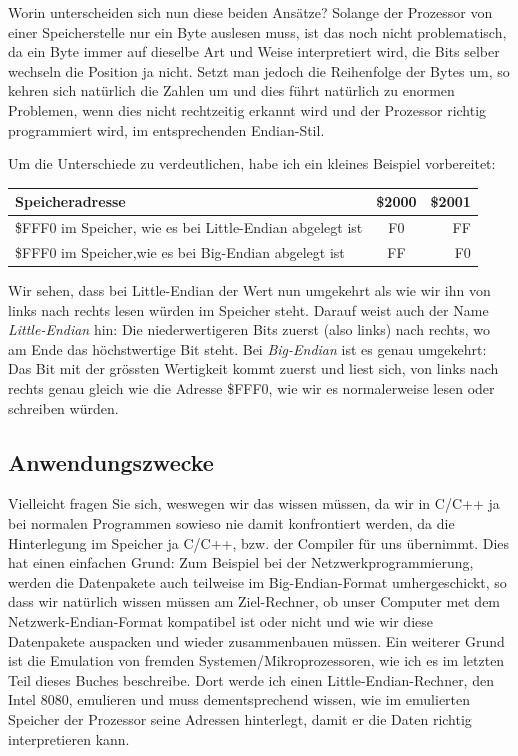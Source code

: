\documentclass[b5paper,10pt,dvips,fleqn,titlepage,twoside]{book}
\begin{document}
Worin unterscheiden sich nun diese beiden Ansätze? Solange der Prozessor von einer Speicherstelle nur ein Byte auslesen muss, ist das noch nicht problematisch, da ein Byte immer auf dieselbe Art und Weise interpretiert wird, die Bits selber wechseln die Position ja nicht. Setzt man jedoch die Reihenfolge der Bytes um, so kehren sich natürlich die Zahlen um und dies führt natürlich zu enormen Problemen, wenn dies nicht rechtzeitig erkannt wird und der Prozessor richtig programmiert wird, im entsprechenden Endian-Stil.\newline

Um die Unterschiede zu verdeutlichen, habe ich ein kleines Beispiel vorbereitet:\newline

\begin{center}
\begin{tabular}{|p{2in}|c|r|}\hline
Speicheradresse & \$2000 & \$2001 \\\hline
\$FFF0 im Speicher, wie es bei Little-Endian abgelegt ist & F0 & FF\\\hline
\$FFF0 im Speicher,wie es bei Big-Endian abgelegt ist & FF & F0\\\hline
\end{tabular}
\end{center}


Wir sehen, dass bei Little-Endian der Wert nun umgekehrt als wie wir ihn von links nach rechts lesen würden im Speicher steht. Darauf weist auch der Name \emph{Little-Endian} hin: Die niederwertigeren Bits zuerst (also links) nach rechts, wo am Ende das höchstwertige Bit steht. Bei \emph{Big-Endian} ist es genau umgekehrt: Das Bit mit der grössten Wertigkeit kommt zuerst und liest sich, von links nach rechts genau gleich wie die Adresse \$FFF0, wie wir es normalerweise lesen oder schreiben würden.
\subsection{Anwendungszwecke}
Vielleicht fragen Sie sich, weswegen wir das wissen müssen, da wir in C/C++ ja bei normalen Programmen sowieso nie damit konfrontiert werden, da die Hinterlegung im Speicher ja C/C++, bzw. der Compiler für uns übernimmt. Dies hat einen einfachen Grund: Zum Beispiel bei der Netzwerkprogrammierung, werden die Datenpakete auch teilweise im Big-Endian-Format umhergeschickt, so dass wir natürlich wissen müssen am Ziel-Rechner, ob unser Computer met dem Netzwerk-Endian-Format kompatibel ist oder nicht und wie wir diese Datenpakete auspacken und wieder zusammenbauen müssen.
Ein weiterer Grund ist die Emulation von fremden Systemen/Mikroprozessoren, wie ich es im letzten Teil dieses Buches beschreibe. Dort werde ich einen Little-Endian-Rechner, den Intel 8080, emulieren und muss dementsprechend wissen, wie im emulierten Speicher der Prozessor seine Adressen hinterlegt, damit er die Daten richtig interpretieren kann.\\
\end{document}
